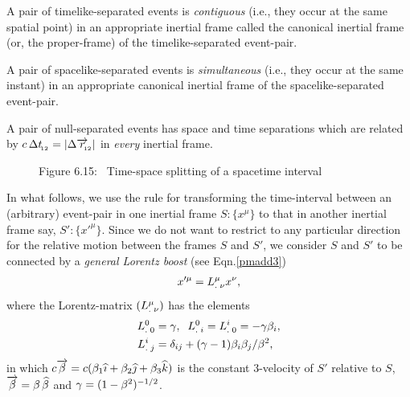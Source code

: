 \lem  A pair of  timelike-separated events is 
\textsl{contiguous} (i.e., they occur at the same 
spatial 
point) in an appropriate inertial frame called the 
canonical 
inertial frame (or, the proper-frame) of  the  
timelike-separated event-pair.

\lem  A pair of spacelike-separated events is 
\textsl{simultaneous} (i.e., they occur at the same 
instant) 
in an appropriate canonical inertial frame of the 
spacelike-separated event-pair.

\lem A pair of null-separated events has space and 
time 
separations which are related by $ c\,\Delta t_{_{\hspace*{-1.5pt}{12}}} 
= | 
\Delta \overrightarrow{r}_{_{\hspace*{-1.5pt}{\negthinspace\negthinspace 12}}} |$ in \textsl{every} 
inertial 
frame.

\begin{figure}[H]
\begin{center}
\end{center}
\caption*{Figure 6.15:~ Time-space splitting of a spacetime 
interval}\label{fig6.15}
\end{figure}
In what follows, we use the rule for transforming the 
time-interval between an (arbitrary) event-pair in one 
inertial frame $S:\{x^\mu\}$ to that in another 
inertial 
frame  say, $ S':\{x'^\mu\}$. Since we do not want to 
restrict to any particular direction for the relative 
motion 
between the frames $S$ and $S'$, we consider $S$ and 
$S'$ 
to 
be connected by a \textsl{general Lorentz boost} (see 
Eqn.\eqref{pmadd3})
\begin{align}\label{1}
x'^\mu = {{L}^{\mu}_{.\;\nu}}x^\nu,
\end{align}
where the Lorentz-matrix $({{L}^{\mu}_{.\;\nu}})$ has the
elements
\begin{align} \label{2}
\mtud{L}{0}{0} &  = \gkg, \; \;
\mtud{L}{0}{i}  = \mtud{L}{i} {0}= - \gkg \gkb_{i}, 
\noindent\\
\mtud{L}{i} {j}&= \delta_{ij} + (\gkg - 1) \gkb_{i}
\gkb_{j} /\gkb^2,
\end{align}
in which $c \overrightarrow{{\beta}} = c ({\beta}_1{\widehat{\imath}}  + {\beta}_2 {\widehat{\jmath}} 
+ 
{\beta}_3{\widehat{k}} )$ is the constant 3-velocity of $S'$ 
relative 
to $S$, $\overrightarrow{{\beta}} =  {\beta}\, {\widehat{{\beta}}}$ and ${\gamma} = 
(1 - {\beta}^2)^{- 1 / 2}$.

